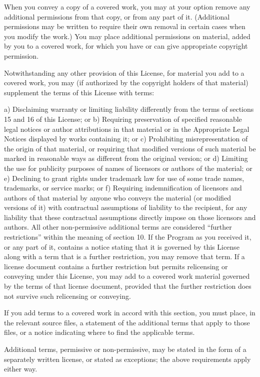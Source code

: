 When you convey a copy of a covered work, you may at your option remove any additional permissions from that copy, or from any part of it. (Additional permissions may be written to require their own removal in certain cases when you modify the work.) You may place additional permissions on material, added by you to a covered work, for which you have or can give appropriate copyright permission.

Notwithstanding any other provision of this License, for material you add to a covered work, you may (if authorized by the copyright holders of that material) supplement the terms of this License with terms:

a) Disclaiming warranty or limiting liability differently from the terms of sections 15 and 16 of this License; or
b) Requiring preservation of specified reasonable legal notices or author attributions in that material or in the Appropriate Legal Notices displayed by works containing it; or
c) Prohibiting misrepresentation of the origin of that material, or requiring that modified versions of such material be marked in reasonable ways as different from the original version; or
d) Limiting the use for publicity purposes of names of licensors or authors of the material; or
e) Declining to grant rights under trademark law for use of some trade names, trademarks, or service marks; or
f) Requiring indemnification of licensors and authors of that material by anyone who conveys the material (or modified versions of it) with contractual assumptions of liability to the recipient, for any liability that these contractual assumptions directly impose on those licensors and authors.
All other non-permissive additional terms are considered “further restrictions” within the meaning of section 10. If the Program as you received it, or any part of it, contains a notice stating that it is governed by this License along with a term that is a further restriction, you may remove that term. If a license document contains a further restriction but permits relicensing or conveying under this License, you may add to a covered work material governed by the terms of that license document, provided that the further restriction does not survive such relicensing or conveying.

If you add terms to a covered work in accord with this section, you must place, in the relevant source files, a statement of the additional terms that apply to those files, or a notice indicating where to find the applicable terms.

Additional terms, permissive or non-permissive, may be stated in the form of a separately written license, or stated as exceptions; the above requirements apply either way.

